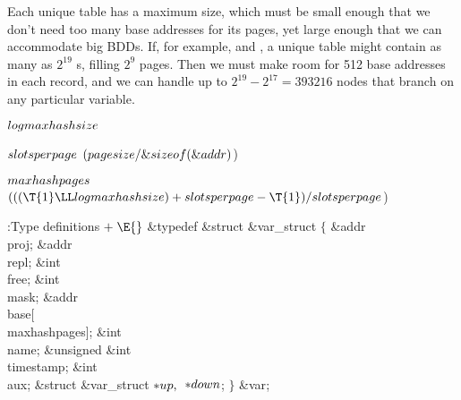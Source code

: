 Each unique table has a maximum size, which must be small enough
that we don't need too many base addresses for its pages, yet large
enough that we can accommodate big BDDs. If, for example,
 and , a unique
table might contain as
many as $2^{19}$ s, filling $2^9$ pages. Then we must make room
for
512 base addresses in each  record, and we can handle up to
$2^{19}-2^{17}=393216$ nodes that branch on any particular variable.

\Y\B\4\D$\\{logmaxhashsize}$ \5
\par
\B\4\D$\\{slotsperpage}$ \5
$(\\{pagesize}/\&{sizeof}(\&{addr}){}$)\par
\B\4\D$\\{maxhashpages}$ \5
$(((\T{1}\LL\\{logmaxhashsize})+\\{slotsperpage}-\T{1})/\\{slotsperpage}{}$)\par
\Y\B\4:Type definitions\X${}\mathrel+\E{}$\6
\&{typedef} \&{struct} \&{var\_struct} ${}\{{}$\1\6
\&{addr} \\{proj};\6
\&{addr} \\{repl};\6
\&{int} \\{free};\6
\&{int} \\{mask};\6
\&{addr} \\{base}[\\{maxhashpages}];\6
\&{int} \\{name};\6
\&{unsigned} \&{int} \\{timestamp};\6
\&{int} \\{aux};\6
\&{struct} \&{var\_struct} ${}{*}\\{up},{}$ ${}{*}\\{down}{}$;\2\6
${}\}{}$ \&{var};\par
\fi

